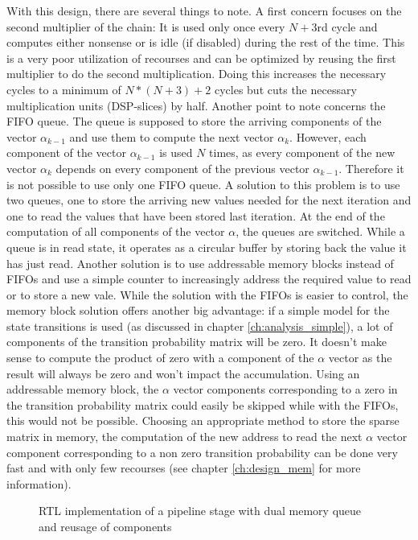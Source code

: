 \documentclass[mscthesis]{usiinfthesis}
\begin{document}
With this design, there are several things to note. A first concern focuses on
the second multiplier of the chain: It is used only once every $N+3$rd cycle
and computes either nonsense or is idle (if disabled) during the rest of the
time.  This is a very poor utilization of recourses and can be optimized by
reusing the first multiplier to do the second multiplication. Doing this
increases the necessary cycles to a minimum of $N*(N+3)+2$ cycles but cuts the
necessary multiplication units (DSP-slices) by half. Another point to note
concerns the FIFO queue. The queue is supposed to store the arriving components
of the vector $\alpha_{k-1}$ and use them to compute the next vector
$\alpha_k$.  However, each component of the vector $\alpha_{k-1}$ is used $N$
times, as every component of the new vector $\alpha_k$ depends on every
component of the previous vector $\alpha_{k-1}$. Therefore it is not possible
to use only one FIFO queue. A solution to this problem is to use two queues,
one to store the arriving new values needed for the next iteration and one to
read the values that have been stored last iteration. At the end of the
computation of all components of the vector $\alpha$, the queues are switched.
While a queue is in read state, it operates as a circular buffer by storing
back the value it has just read. Another solution is to use addressable memory
blocks instead of FIFOs and use a simple counter to increasingly address the
required value to read or to store a new vale. While the solution with the
FIFOs is easier to control, the memory block solution offers another big
advantage: if a simple model for the state transitions is used (as discussed in
chapter \ref{ch:analysis_simple}), a lot of components of the transition
probability matrix will be zero. It doesn't make sense to compute the product
of zero with a component of the $\alpha$ vector as the result will always be
zero and won't impact the accumulation. Using an addressable memory block, the
$\alpha$ vector components corresponding to a zero in the transition
probability matrix could easily be skipped while with the FIFOs, this would not
be possible. Choosing an appropriate method to store the sparse matrix in
memory, the computation of the new address to read the next $\alpha$ vector
component corresponding to a non zero transition probability can be done very
fast and with only few recourses (see chapter \ref{ch:design_mem} for more
information).

\begin{figure}
    \centering
    
    \caption{RTL implementation of a pipeline stage with dual memory queue and
        reusage of components}
    \label{fig:arch_step}
\end{figure}
\end{document}
